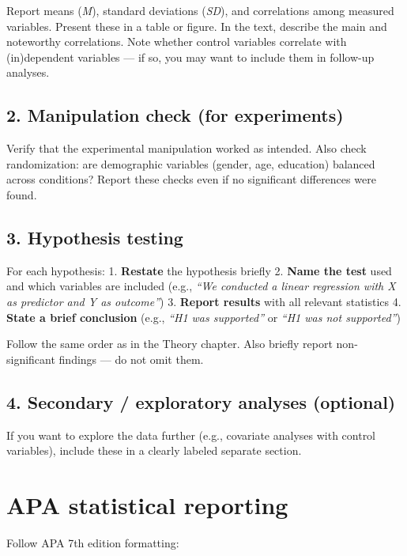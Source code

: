 \documentclass[
  11pt,
  a4paper,
]{scrbook}
\begin{document}
Report means (\emph{M}), standard deviations (\emph{SD}), and
correlations among measured variables. Present these in a table or
figure. In the text, describe the main and noteworthy correlations. Note
whether control variables correlate with (in)dependent variables --- if
so, you may want to include them in follow-up analyses.

\subsection{2. Manipulation check (for
experiments)}\label{manipulation-check-for-experiments}

Verify that the experimental manipulation worked as intended. Also check
randomization: are demographic variables (gender, age, education)
balanced across conditions? Report these checks even if no significant
differences were found.

\subsection{3. Hypothesis testing}\label{hypothesis-testing}

For each hypothesis: 1. \textbf{Restate} the hypothesis briefly 2.
\textbf{Name the test} used and which variables are included (e.g.,
\emph{``We conducted a linear regression with X as predictor and Y as
outcome''}) 3. \textbf{Report results} with all relevant statistics 4.
\textbf{State a brief conclusion} (e.g., \emph{``H1 was supported''} or
\emph{``H1 was not supported''})

Follow the same order as in the Theory chapter. Also briefly report
non-significant findings --- do not omit them.

\subsection{4. Secondary / exploratory analyses
(optional)}\label{secondary-exploratory-analyses-optional}

If you want to explore the data further (e.g., covariate analyses with
control variables), include these in a clearly labeled separate section.

\section{APA statistical reporting}\label{apa-statistical-reporting}

Follow APA 7th edition formatting:
\end{document}
